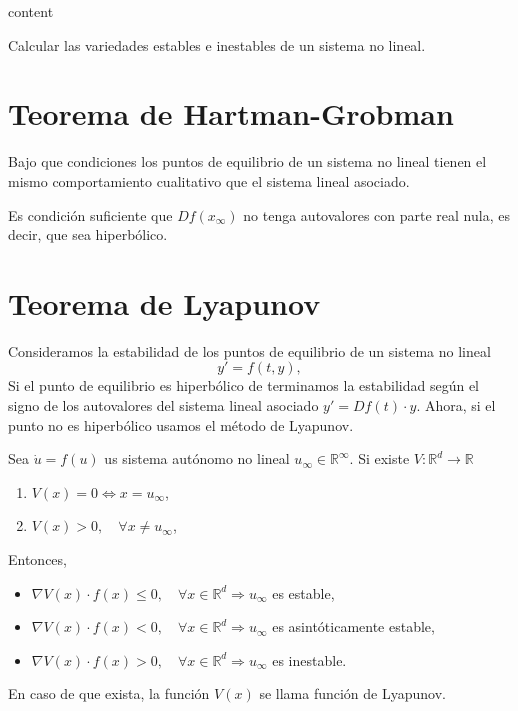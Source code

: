 \begin{theo}
  content
\end{theo}

\begin{ejm}
  Calcular las variedades estables e inestables de un sistema no lineal.
\end{ejm}

\section{Teorema de Hartman-Grobman}

\begin{obs}
  Bajo que condiciones los puntos de equilibrio de un sistema no lineal tienen el mismo comportamiento cualitativo que el sistema lineal asociado.
\end{obs}

\begin{theo}
  Es condición suficiente que $Df(x_{\infty})$ no tenga autovalores con parte real nula, es decir, que sea hiperbólico.
\end{theo}

\section{Teorema de Lyapunov}

\begin{obs}
  Consideramos la estabilidad de los puntos de equilibrio de un sistema no lineal
  \[ 
    y' = f(t,y), 
  \] 
  Si el punto de equilibrio es hiperbólico de terminamos la estabilidad según el signo de los autovalores del sistema lineal asociado $y' = Df(t) \cdot y$. Ahora, si el punto no es hiperbólico usamos el método de Lyapunov.
\end{obs}

\begin{theo}[de Lyapunov] 
  Sea $\dot{u} = f(u)$ us sistema autónomo no lineal $u_{\infty} \in \mathbb{R}^{\infty}$. Si existe $V : \mathbb{R}^{d} \to \mathbb{R}$ 
  \begin{enumerate}[label=(\roman*)]
    \item $V(x) = 0 \Leftrightarrow x = u_{\infty}$, 
    \item $V(x) > 0, \quad \forall x \neq u_{\infty}$,
  \end{enumerate}
  Entonces,
  \begin{itemize}
    \item $\nabla V(x) \cdot f(x) \leq 0, \quad \forall x \in \mathbb{R}^{d} \Rightarrow u_{\infty}$ es estable,
    \item $\nabla V(x) \cdot f(x) < 0, \quad \forall x \in \mathbb{R}^{d} \Rightarrow u_{\infty}$ es asintóticamente estable,
    \item $\nabla V(x) \cdot f(x) > 0, \quad \forall x \in \mathbb{R}^{d} \Rightarrow u_{\infty}$ es inestable.
  \end{itemize}
  En caso de que exista, la función $V(x)$ se llama función de Lyapunov.
\end{theo}
